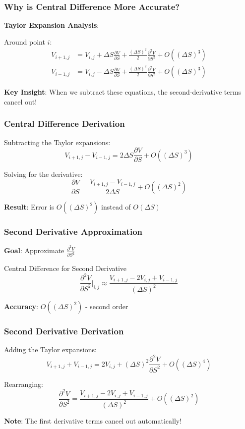 \documentclass[aspectratio=169]{beamer}
\begin{document}
\begin{frame}
\frametitle{Why is Central Difference More Accurate?}
\textbf{Taylor Expansion Analysis}:

Around point $i$:
\begin{align}
V_{i+1,j} &= V_{i,j} + \Delta S \frac{\partial V}{\partial S} + \frac{(\Delta S)^2}{2} \frac{\partial^2 V}{\partial S^2} + O((\Delta S)^3) \\
V_{i-1,j} &= V_{i,j} - \Delta S \frac{\partial V}{\partial S} + \frac{(\Delta S)^2}{2} \frac{\partial^2 V}{\partial S^2} + O((\Delta S)^3)
\end{align}

\textbf{Key Insight}: When we subtract these equations, the second-derivative terms cancel out!
\end{frame}

\begin{frame}
\frametitle{Central Difference Derivation}
Subtracting the Taylor expansions:
\[V_{i+1,j} - V_{i-1,j} = 2\Delta S \frac{\partial V}{\partial S} + O((\Delta S)^3)\]

Solving for the derivative:
\[\frac{\partial V}{\partial S} = \frac{V_{i+1,j} - V_{i-1,j}}{2\Delta S} + O((\Delta S)^2)\]

\textbf{Result}: Error is $O((\Delta S)^2)$ instead of $O(\Delta S)$
\end{frame}

\begin{frame}
\frametitle{Second Derivative Approximation}
\textbf{Goal}: Approximate $\frac{\partial^2 V}{\partial S^2}$

\begin{block}{Central Difference for Second Derivative}
\[\frac{\partial^2 V}{\partial S^2} \bigg|_{i,j} \approx \frac{V_{i+1,j} - 2V_{i,j} + V_{i-1,j}}{(\Delta S)^2}\]
\end{block}

\textbf{Accuracy}: $O((\Delta S)^2)$ - second order
\end{frame}

\begin{frame}
\frametitle{Second Derivative Derivation}
Adding the Taylor expansions:
\[V_{i+1,j} + V_{i-1,j} = 2V_{i,j} + (\Delta S)^2 \frac{\partial^2 V}{\partial S^2} + O((\Delta S)^4)\]

Rearranging:
\[\frac{\partial^2 V}{\partial S^2} = \frac{V_{i+1,j} - 2V_{i,j} + V_{i-1,j}}{(\Delta S)^2} + O((\Delta S)^2)\]

\textbf{Note}: The first derivative terms cancel out automatically!
\end{frame}
\end{document}
